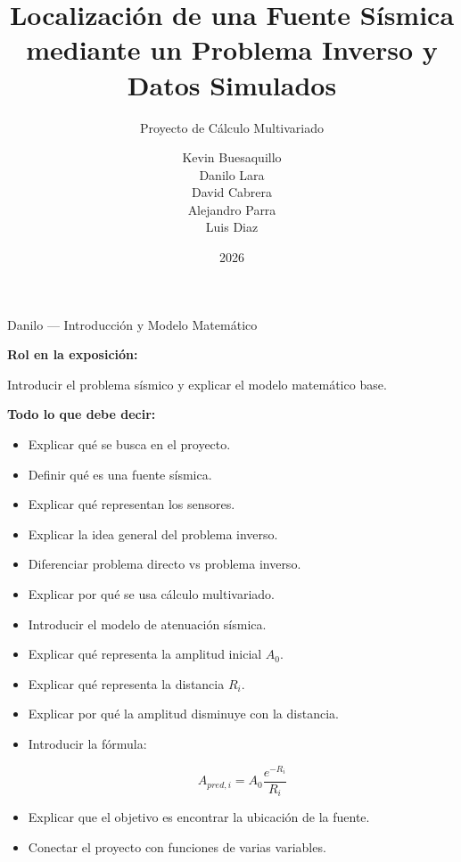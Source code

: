 \documentclass[aspectratio=169]{beamer}
\title{Localización de una Fuente Sísmica \\
mediante un Problema Inverso y Datos Simulados}
\subtitle{Proyecto de Cálculo Multivariado}
\author{
Kevin Buesaquillo \\
Danilo Lara \\
David Cabrera \\
Alejandro Parra \\
Luis Diaz
}
\institute{
Ingeniería de Software
}
\date{2026}
\begin{document}

\begin{frame}
    \titlepage
\end{frame}


\begin{frame}{Danilo — Introducción y Modelo Matemático}

\textbf{Rol en la exposición:}

Introducir el problema sísmico y explicar el modelo matemático base.

\vspace{0.4cm}

\textbf{Todo lo que debe decir:}

\begin{itemize}
    \item Explicar qué se busca en el proyecto.
    \item Definir qué es una fuente sísmica.
    \item Explicar qué representan los sensores.
    \item Explicar la idea general del problema inverso.
    \item Diferenciar problema directo vs problema inverso.
    \item Explicar por qué se usa cálculo multivariado.
    \item Introducir el modelo de atenuación sísmica.
    \item Explicar qué representa la amplitud inicial $A_0$.
    \item Explicar qué representa la distancia $R_i$.
    \item Explicar por qué la amplitud disminuye con la distancia.
    \item Introducir la fórmula:
    
    $$
    A_{pred,i}=A_0\frac{e^{-R_i}}{R_i}
    $$

    \item Explicar que el objetivo es encontrar la ubicación de la fuente.
    \item Conectar el proyecto con funciones de varias variables.
\end{itemize}

\end{frame}

\end{document}
